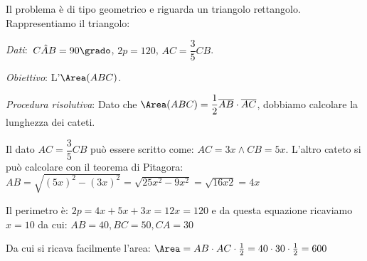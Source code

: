 \begin{soluzione}
 Il problema è di tipo geometrico e riguarda un triangolo rettangolo.
Rappresentiamo il triangolo:

\begin{multicols}{2}

\emph{Dati}:~$C\hat{{A}}B=90\grado$, $2p= 120$, $AC=\dfrac{3}{5}CB$.

\emph{Obiettivo}: L'$\Area (ABC)$.

\begin{center}
 
\end{center}
\end{multicols}

\emph{Procedura risolutiva}:
Dato che $\Area (ABC) =\dfrac{1}{2}\overline{AB}\cdot \overline{AC}$,
dobbiamo calcolare la lunghezza dei cateti.

Il dato $AC=\dfrac{3}{5}CB$ può essere scritto come: $AC=3x \wedge CB=5x$.
L'altro cateto si può calcolare con il teorema di Pitagora:
$AB=\sqrt{(5x)^2-(3x)^2}=\sqrt{25x^2-9x^2}=\sqrt{16x2}=4x$

Il perimetro è: $2p=4x+5x+3x=12x=120$ e da questa equazione ricaviamo 
$x=10$ da cui: $AB=40, BC=50, CA=30$

Da cui si ricava facilmente l'area: 
$\Area=AB \cdot AC \cdot \frac{1}{2} = 40 \cdot 30 \cdot \frac{1}{2} =600$
\end{soluzione}

